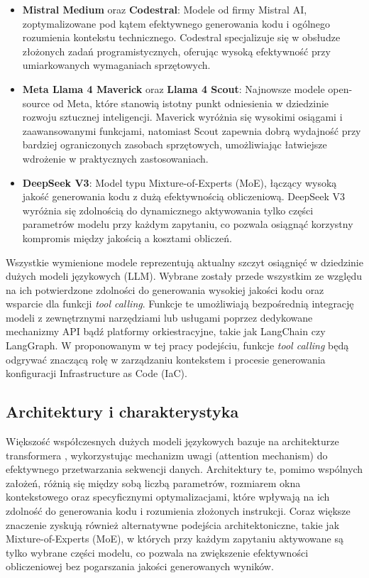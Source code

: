 \begin{itemize}
    \item \textbf{Mistral Medium} oraz \textbf{Codestral}: Modele od firmy Mistral AI, zoptymalizowane pod kątem efektywnego generowania kodu i ogólnego rozumienia kontekstu technicznego. Codestral specjalizuje się w obsłudze złożonych zadań programistycznych, oferując wysoką efektywność przy umiarkowanych wymaganiach sprzętowych.
    \item \textbf{Meta Llama 4 Maverick} oraz \textbf{Llama 4 Scout}: Najnowsze modele open-source od Meta, które stanowią istotny punkt odniesienia w dziedzinie rozwoju sztucznej inteligencji. Maverick wyróżnia się wysokimi osiągami i zaawansowanymi funkcjami, natomiast Scout zapewnia dobrą wydajność przy bardziej ograniczonych zasobach sprzętowych, umożliwiając łatwiejsze wdrożenie w praktycznych zastosowaniach.
    \item \textbf{DeepSeek V3}: Model typu Mixture-of-Experts (MoE), łączący wysoką jakość generowania kodu z dużą efektywnością obliczeniową. DeepSeek V3 wyróżnia się zdolnością do dynamicznego aktywowania tylko części parametrów modelu przy każdym zapytaniu, co pozwala osiągnąć korzystny kompromis między jakością a kosztami obliczeń.
\end{itemize}

Wszystkie wymienione modele reprezentują aktualny szczyt osiągnięć w dziedzinie dużych modeli językowych (LLM). Wybrane zostały przede wszystkim ze względu na ich potwierdzone zdolności do generowania wysokiej jakości kodu oraz wsparcie dla funkcji \textit{tool calling}. Funkcje te umożliwiają bezpośrednią integrację modeli z zewnętrznymi narzędziami lub usługami poprzez dedykowane mechanizmy API bądź platformy orkiestracyjne, takie jak LangChain czy LangGraph. W proponowanym w tej pracy podejściu, funkcje \textit{tool calling} będą odgrywać znaczącą rolę w zarządzaniu kontekstem i procesie generowania konfiguracji Infrastructure as Code (IaC).

\subsection{Architektury i charakterystyka}

Większość współczesnych dużych modeli językowych bazuje na architekturze transformera \cite{vaswani_attention_2023}, wykorzystując mechanizm uwagi (attention mechanism) do efektywnego przetwarzania sekwencji danych. Architektury te, pomimo wspólnych założeń, różnią się między sobą liczbą parametrów, rozmiarem okna kontekstowego oraz specyficznymi optymalizacjami, które wpływają na ich zdolność do generowania kodu i rozumienia złożonych instrukcji. Coraz większe znaczenie zyskują również alternatywne podejścia architektoniczne, takie jak Mixture-of-Experts (MoE), w których przy każdym zapytaniu aktywowane są tylko wybrane części modelu, co pozwala na zwiększenie efektywności obliczeniowej bez pogarszania jakości generowanych wyników.


